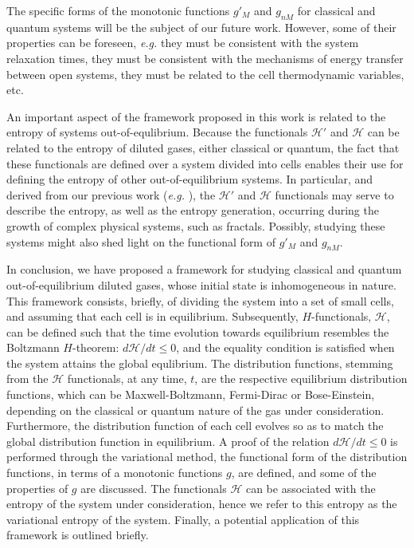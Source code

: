 The specific forms of the monotonic functions $g'_M$ and $g_{nM}$ for classical and quantum systems will be the
subject of our future work. However, some of their properties can be foreseen, \textit{e.g.} they must
be consistent with the system relaxation times, they must be consistent with the mechanisms of 
energy transfer between open systems, they must be related to the cell thermodynamic variables, etc.

An important aspect of the framework proposed in this work is related to the entropy of systems
out-of-equlibrium. Because the functionals $\mathcal{H}'$ and $\mathcal{H}$ can be related to
the entropy of diluted gases, either classical or quantum, the fact that these functionals are defined
over a system divided into cells enables their use for defining the entropy
of other out-of-equilibrium systems. In particular, and 
derived from our previous work (\textit{e.g.} \cite{bib:nicolas2020,bib:nicolas2016}), the
$\mathcal H'$ and $\mathcal H$ functionals may serve to describe the entropy,
as well as the entropy generation, occurring during the
growth of complex physical systems, such as fractals. Possibly, studying these systems might also
shed light on the functional form of $g'_M$ and $g_{nM}$.

In conclusion, we have proposed a framework for studying classical and quantum out-of-equilibrium
diluted gases, whose initial
state is inhomogeneous in nature. This framework consists, briefly, of dividing the system into
a set of small cells, and assuming that each cell is in equilibrium. Subsequently,
$H$-functionals, $\mathcal H$, can be defined
such that the time evolution towards equilibrium resembles the Boltzmann $H$-theorem: $d\mathcal H/dt\leq0$,
and the equality condition is satisfied when the system attains the global equlibrium.
The distribution functions,
stemming from the $\mathcal H$ functionals, at any time, $t$, are the respective equilibrium distribution functions,
which can be Maxwell-Boltzmann, Fermi-Dirac or Bose-Einstein, depending on the classical or quantum nature
of the gas under consideration. Furthermore,
the distribution function of each cell evolves so as to match the global distribution function in equilibrium.
A proof of the relation $d\mathcal H/dt\leq0$ is performed through the variational method,
the functional form of the distribution
functions, in terms of a monotonic functions $g$, are defined, and some of the properties of $g$ are discussed.
The functionals $\mathcal H$ can be associated with the entropy of the system under consideration, hence we
refer to this entropy as the variational entropy of the system. Finally,
a potential application of this framework is outlined briefly. 




